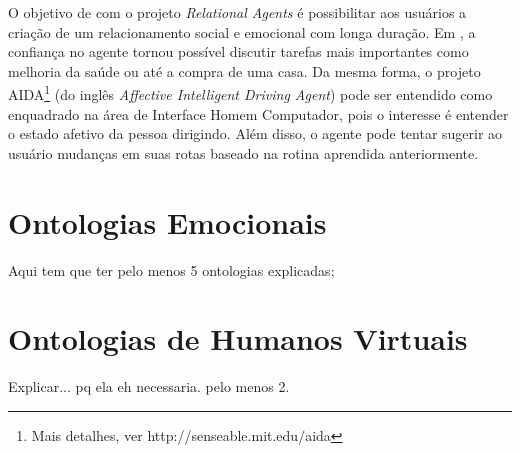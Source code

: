 O objetivo de \citet{bick2003relational} com o projeto \emph{Relational
Agents} é possibilitar aos usuários a criação de um relacionamento social e
emocional com longa duração.  Em \citet{bickmore2009virtual}, a confiança no
agente tornou possível discutir tarefas mais importantes como melhoria da saúde
ou até a compra de uma casa. Da mesma forma, o projeto
AIDA\footnote{Mais detalhes, ver http://senseable.mit.edu/aida} (do
inglês \emph{Affective Intelligent Driving Agent}) pode ser entendido como
enquadrado na área de Interface Homem Computador, pois o interesse é entender o
estado afetivo da pessoa dirigindo. Além disso, o agente pode tentar sugerir
ao usuário mudanças em suas rotas baseado na rotina aprendida anteriormente.

\section{Ontologias Emocionais} \label{cap:eda:oe}

Aqui tem que ter pelo menos 5 ontologias explicadas;


\section{Ontologias de Humanos Virtuais} \label{cap:eda:odhv}

Explicar...
	pq ela eh necessaria.
	pelo menos 2.
